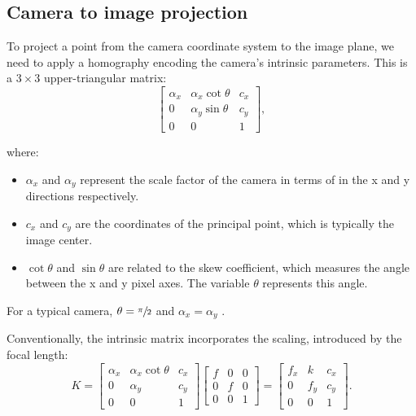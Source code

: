 \subsection{Camera to image projection}\label{sub:camera_to_image_projection}

To project a point from the camera coordinate system to the image plane, we
need to apply a homography encoding the camera's intrinsic parameters.
This is a \(3 \times 3\) upper-triangular matrix:
\begin{equation}
	\begin{bmatrix}
		\alpha_x & \alpha_x \cot \theta & c_x \\
		0        & \alpha_y \sin \theta & c_y \\
		0        & 0                    & 1
	\end{bmatrix},
\end{equation}

where:
\begin{itemize}
	\item $\alpha_x$ and $\alpha_y$ represent the scale factor of the camera in
	      terms of  in the x and y directions respectively.
	\item $c_x$ and $c_y$ are the coordinates of the principal point, which is typically the image center.
	\item $\cot \theta$ and $\sin \theta$ are related to the skew coefficient, which measures the angle between the x and y pixel axes. The variable $\theta$ represents this angle.
\end{itemize}
For a typical camera, \(\theta = \sfrac{\pi}{2}\) and \(\alpha_x = \alpha_y\)
\cite{hartleyMultipleViewGeometry2004}.

Conventionally, the intrinsic matrix incorporates the scaling, introduced
by the focal length:
\begin{equation}
	K = \begin{bmatrix}
		\alpha_x & \alpha_x \cot \theta & c_x \\
		0        & \alpha_y             & c_y \\
		0        & 0                    & 1
	\end{bmatrix} \begin{bmatrix}
		f & 0 & 0 \\
		0 & f & 0 \\
		0 & 0 & 1
	\end{bmatrix} = \begin{bmatrix}
		f_x & k   & c_x \\
		0   & f_y & c_y \\
		0   & 0   & 1
	\end{bmatrix}.
\end{equation}

